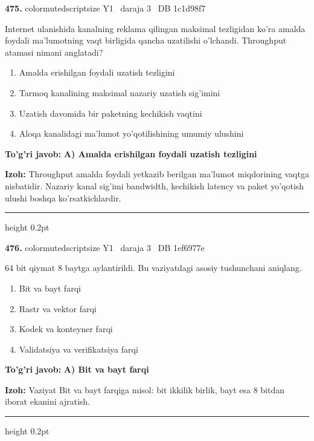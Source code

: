 \documentclass[10pt,a4paper,oneside]{article}
\begin{document}
\noindent\textbf{\color{ink}475.}  {color{muted}scriptsize Y1 \textbullet\ daraja 3 \textbullet\ DB 1c1d98f7}
\par
Internet ulanishida kanalning reklama qilingan maksimal tezligidan ko'ra amalda foydali ma'lumotning vaqt birligida qancha uzatilishi o'lchandi. Throughput atamasi nimani anglatadi?
\begin{enumerate}[label=\Alph*),leftmargin=9mm]
\item Amalda erishilgan foydali uzatish tezligini
\item Tarmoq kanalining maksimal nazariy uzatish sig'imini
\item Uzatish davomida bir paketning kechikish vaqtini
\item Aloqa kanalidagi ma'lumot yo'qotilishining umumiy ulushini
\end{enumerate}
\begin{tcolorbox}[enhanced,breakable,colback=teal!4,colframe=teal!50!black,boxrule=0.5pt,arc=1.1mm,left=3mm,right=3mm,top=1.7mm,bottom=1.7mm,before skip=2mm,after skip=2mm]
\textbf{\color{teal}To'g'ri javob:} \textbf{A) Amalda erishilgan foydali uzatish tezligini}
\par\smallskip
\textbf{Izoh:} Throughput amalda foydali yetkazib berilgan ma'lumot miqdorining vaqtga nisbatidir. Nazariy kanal sig'imi bandwidth, kechikish latency va paket yo'qotish ulushi boshqa ko'rsatkichlardir.
\end{tcolorbox}
\vspace{2mm}\hrule height 0.2pt \vspace{3mm}

\noindent\textbf{\color{ink}476.}  {color{muted}scriptsize Y1 \textbullet\ daraja 3 \textbullet\ DB 1ef6977e}
\par
64 bit qiymat 8 baytga aylantirildi. Bu vaziyatdagi asosiy tushunchani aniqlang.
\begin{enumerate}[label=\Alph*),leftmargin=9mm]
\item Bit va bayt farqi
\item Rastr va vektor farqi
\item Kodek va konteyner farqi
\item Validatsiya va verifikatsiya farqi
\end{enumerate}
\begin{tcolorbox}[enhanced,breakable,colback=teal!4,colframe=teal!50!black,boxrule=0.5pt,arc=1.1mm,left=3mm,right=3mm,top=1.7mm,bottom=1.7mm,before skip=2mm,after skip=2mm]
\textbf{\color{teal}To'g'ri javob:} \textbf{A) Bit va bayt farqi}
\par\smallskip
\textbf{Izoh:} Vaziyat Bit va bayt farqiga misol: bit ikkilik birlik, bayt esa 8 bitdan iborat ekanini ajratish.
\end{tcolorbox}
\vspace{2mm}\hrule height 0.2pt \vspace{3mm}
\end{document}
